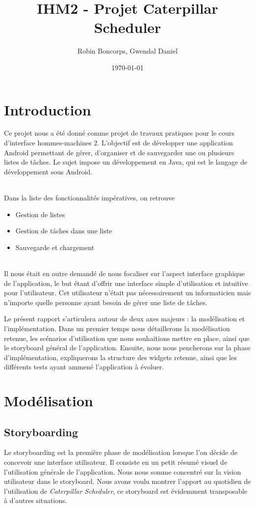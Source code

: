 \documentclass[a4paper, 11pt, french]{report}
\title{IHM2 - Projet Caterpillar Scheduler}
\author{Robin Boncorps, Gwendal Daniel}
\date{\today}
\begin{document}
\maketitle

\renewcommand{\contentsname}{Sommaire} %
\tableofcontents

\chapter{Introduction} %
Ce projet nous a été donné comme projet de travaux pratiques pour le cours d'interface hommes-machines 2. L'objectif est de développer une application Android permettant de gérer, d'organiser et de sauvegarder une ou plusieurs listes de tâches. Le sujet impose un développement en Java, qui est le langage de développement sous Android.
\newline

~\\
Dans la liste des fonctionnalités impératives, on retrouve
\begin{itemize}
\item Gestion de listes
\item Gestion de tâches dans une liste
\item Sauvegarde et chargement
\end{itemize}
~\\

Il nous était en outre demandé de nous focaliser sur l'aspect interface graphique de l'application, le but étant d'offrir une interface simple d'utilisation et intuitive pour l'utilisateur. Cet utilisateur n'était pas nécessairement un informaticien mais n'importe quelle personne ayant besoin de gérer une liste de tâches.
\newline

Le présent rapport s'articulera autour de deux axes majeurs : la modélisation et l'implémentation. Dans un premier temps nous détaillerons la modélisation retenue, les scénarios d'utilisation que nous souhaitions mettre en place, ainsi que le storyboard général de l'application. Ensuite, nous nous pencherons sur la phase d'implémentation, expliquerons la structure des widgets retenue, ainsi que les différents tests ayant ammené l'application à évoluer.

\chapter{Modélisation}
		\section{Storyboarding} %
Le storyboarding est la première phase de modélisation lorsque l'on décide de concevoir une interface utilisateur. Il consiste en un petit résumé visuel de l'utilisation générale de l'application. Nous nous somme concentré sur la vision utilisateur dans le storyboard. Nous avons voulu montrer l'apport au quotidien de l'utilisation de \emph{Caterpillar Scheduler}, ce storyboard est évidemment transposable à d'autres situations.
\end{document}
